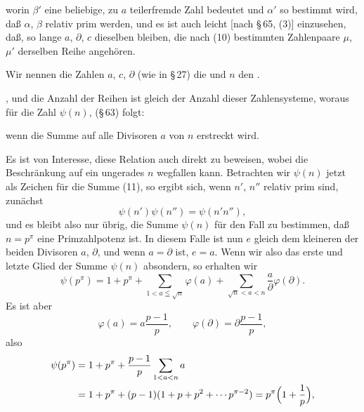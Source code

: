
worin $\beta'$ eine beliebige, zu $a$ teilerfremde Zahl bedeutet und
$\alpha'$ so bestimmt wird, daß $\alpha$, $\beta$ relativ prim werden, und
es ist auch leicht [nach §\,65, (3)] einzusehen, daß, so lange $a$,
$\partial$, $c$ dieselben bleiben, die nach (10) bestimmten Zahlenpaare
$\mu$, $\mu'$ derselben Reihe angehören.

Wir nennen die Zahlen $a$, $c$, $\partial$ (wie in §\,27) die
 und $n$ den .

, und die Anzahl der Reihen ist gleich der Anzahl dieser
Zahlensysteme, woraus für die Zahl $\psi(n)$, (§\,63) folgt:


wenn die Summe auf alle Divisoren $a$ von $n$ erstreckt wird.

Es ist von Interesse, diese Relation auch direkt zu beweisen, wobei die
Beschränkung auf ein ungerades $n$ wegfallen kann. Betrachten wir $\psi(n)$
jetzt als Zeichen für die Summe (11), so ergibt sich, wenn $n'$, $n''$
relativ prim sind, zunächst
\[
\psi(n')\psi(n'') = \psi(n'n''),
\]
und es bleibt also nur übrig, die Summe $\psi(n)$ für den Fall zu
bestimmen, daß $n=p^\pi$ eine Primzahlpotenz ist. In diesem Falle ist nun
$e$ gleich dem kleineren der beiden Divisoren $a$, $\partial$, und wenn
$a=\partial$ ist, $e=a$. Wenn wir also das erste und letzte Glied der Summe
$\psi(n)$ absondern, so erhalten wir
\[
\psi(p^\pi) = 1 + p^\pi + \sum_{1<a\leqq\sqrt{n}}\varphi(a) + \sum_{\sqrt{n}<a<n}\frac{a}{\partial}\varphi(\partial).
\]
Es ist aber
\[
\varphi(a) = a\frac{p-1}{p}, \qquad \varphi(\partial) = \partial\frac{p-1}{p},
\]
also
\[
\begin{aligned}
\psi(p^\pi) &= 1 + p^\pi + \frac{p-1}{p}\sum_{1<a<n} a\\
&= 1 + p^\pi + (p-1)(1+p+p^2+\cdots p^{\pi-2}) = p^\pi\Bigl(1+\frac{1}{p}\Bigr),
\end{aligned}
\]
